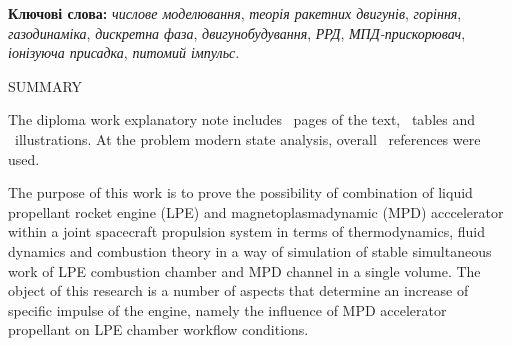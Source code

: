 %
%
%
%
\vspace*{5mm}%
\textbf{Ключові слова:} \textit{числове моделювання}, \textit{теорія ракетних двигунів}, \textit{горіння}, \textit{газодинаміка}, \textit{дискретна фаза}, \textit{двигунобудування}, \textit{РРД}, \textit{МПД-прискорювач}, \textit{іонізуюча присадка}, \textit{питомий імпульс}.

\newpage

\begin{center}
	SUMMARY
\end{center}

The diploma work explanatory note includes  \pageref*{LastPage}~pages of the text, \totaltables~tables and 
\totalfigures~illustrations. At the problem modern state analysis, overall  ~references were used.

The purpose of this work is to prove the possibility of combination of liquid propellant rocket engine (LPE) and magnetoplasmadynamic (MPD) acccelerator within a joint spacecraft propulsion system in terms of thermodynamics, fluid dynamics and combustion theory in a way of simulation of stable simultaneous work of LPE combustion chamber and MPD channel in a single volume. The object of this research is a number of aspects that determine an increase of specific impulse of the engine, namely the influence of MPD accelerator propellant on LPE chamber workflow conditions.

